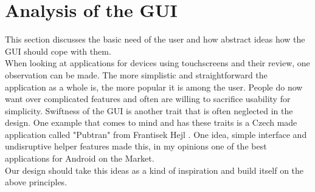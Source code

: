 \documentclass[11pt]{article} %
\begin{document}
\section{Analysis of the GUI}
This section discusses the basic need of the user and how abstract ideas how the GUI should cope with them. \\
When looking at applications for devices using touchscreens and their review, one observation can be made. The more simplistic and straightforward the application as a whole is, the more popular it is among the user. People do now want over complicated features and often are willing to sacrifice usability for simplicity. Swiftness of the GUI is another trait that is often neglected in the design. One example that comes to mind and has these traits is a Czech made application called "Pubtran" from Frantisek Hejl \cite{pubtran}. One idea, simple interface and undisruptive helper features made this, in my opinions one of the best applications for Android on the Market.\\
Our design should take this ideas as a kind of inspiration and build itself on the above principles. 
\end{document}
